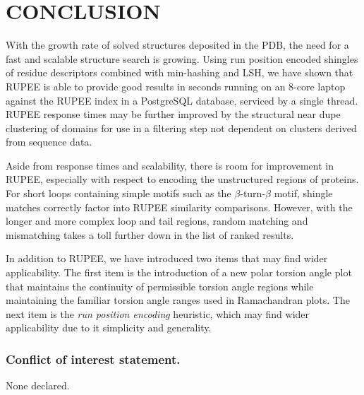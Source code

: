 \documentclass[letter,center,fleqn]{NAR}
\begin{document}
\section{CONCLUSION}

With the growth rate of solved structures deposited in the PDB, the need for a fast and scalable structure search is growing. 
Using run position encoded shingles of residue descriptors combined with min-hashing and LSH, we have shown that RUPEE is able to provide good results in seconds running on an 8-core laptop against the RUPEE index in a PostgreSQL database, serviced by a single thread.
RUPEE response times may be further improved by the structural near dupe clustering of domains for use in a filtering step not dependent on clusters derived from sequence data. 

Aside from response times and scalability, there is room for improvement in RUPEE, especially with respect to encoding the unstructured regions of proteins.
For short loops containing simple motifs such as the $\beta$-turn-$\beta$ motif, shingle matches correctly factor into RUPEE similarity comparisons. 
However, with the longer and more complex loop and tail regions, random matching and mismatching takes a toll further down in the list of ranked results. 

In addition to RUPEE, we have introduced two items that may find wider applicability. 
The first item is the introduction of a new polar torsion angle plot that maintains the continuity of permissible torsion angle regions while maintaining the familiar torsion angle ranges used in Ramachandran plots. 
The next item is the \emph{run position encoding} heuristic, which may find wider applicability due to it simplicity and generality. 

\subsubsection{Conflict of interest statement.} None declared.
\newpage

\nocite{Ayoub2017}
\nocite{BioJava2012}


\end{document}
